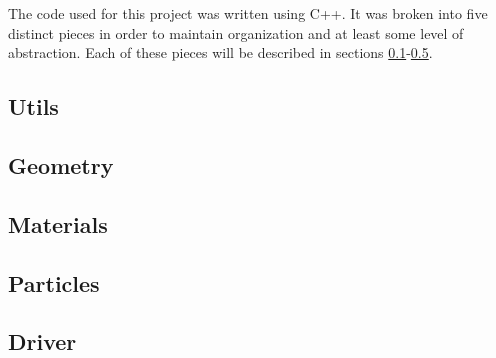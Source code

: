 The code used for this project was written using C++.  It was broken into five distinct pieces in order to maintain organization and at least some level of abstraction.  Each of these pieces will be described in sections \ref{ss:utils}-\ref{ss:driver}.

\subsection{Utils}\label{ss:utils}



\subsection{Geometry}\label{ss:geometry}



\subsection{Materials}\label{ss:materials}



\subsection{Particles}\label{ss:particles}



\subsection{Driver}\label{ss:driver}



